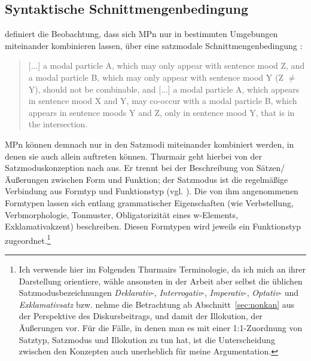 \subsection{Syntaktische Schnittmengenbedingung}
\label{sec:synschnitt}
\citet[20]{Thurmair1991} definiert die Beobachtung, dass sich MPn nur in bestimmten Umgebungen miteinander kombinieren lassen, über eine satzmodale Schnittmengenbedingung :
\begin{quotation}
[...] a modal particle A, which may only appear with sentence mood Z, and a modal particle B, which may only appear with sentence mood Y (Z $\neq$ Y), should not be combinable, and [...] a modal particle A, which appears in sentence mood X and Y, may co-occur with a modal particle B, which appears in sentence moods Y and Z, only in sentence mood Y, that is in the intersection. 
\end{quotation}
MPn können demnach nur in den Satzmodi  miteinander kombiniert werden, in denen sie auch allein auftreten können. Thurmair geht hierbei von der Satzmoduskonzeption nach \citet{Altmann1984, Altmann1987} aus. Er trennt bei der Beschreibung von Sätzen/Äußerungen zwischen Form und Funktion; der Satzmodus ist die regelmäßige Verbindung aus Formtyp  und Funktionstyp  (vgl. \citealt[22]{Altmann1987}). Die von ihm angenommenen Formtypen lassen sich entlang grammatischer Eigenschaften (wie Verbstellung, Verbmorphologie, Tonmuster, Obligatorizität eines w-Elements, Exklamativakzent) beschreiben. Diesen Formtypen wird je\-weils ein Funktionstyp zugeordnet.\footnote{Ich verwende hier im Folgenden Thurmairs Terminologie, da ich mich an ihrer Darstellung orientiere, wähle ansonsten in der Arbeit aber selbst die üblichen Satzmodusbezeichnungen \textit{Deklarativ}-, \textit{Interrogativ}-, \textit{Imperativ}-, \textit{Optativ}- und \textit{Exklamativsatz} bzw. nehme die Betrachtung ab Abschnitt~\ref{sec:nonkan} aus der Perspektive des Diskursbeitrags, und damit der Illokution, der Äußerungen vor. Für die Fälle, in denen man es mit einer 1:1-Zuordnung von Satztyp, Satzmodus und Illokution zu tun hat, ist die Unterscheidung zwischen den Konzepten auch unerheblich für meine Argumentation.}

